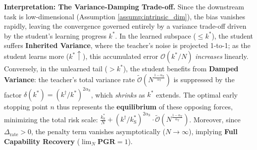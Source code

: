 \documentclass{article}
\theoremstyle{definition}
\theoremstyle{definition}
\theoremstyle{plain}
\theoremstyle{plain}
\theoremstyle{plain}
\theoremstyle{plain}
\theoremstyle{plain}
\newcommand{\te}{\mathrm{T}}
\newcommand{\st}{\mathrm{S}}
\newcommand{\opt}{\mathrm{opt}}
\begin{document}
\textbf{Interpretation: The Variance-Damping Trade-off.}
Since the downstream task is low-dimensional (Assumption \ref{assump:intrinsic_dim}), the bias vanishes rapidly, leaving the convergence governed entirely by a variance trade-off driven by the student's learning progress $k^*$.
In the learned subspace ($\le k^*$), the student suffers \textbf{Inherited Variance}, where the teacher's noise is projected 1-to-1; as the student learns more ($k^* \uparrow$), this accumulated error $\mathcal{O}(k^*/N)$ \textit{increases} linearly.
Conversely, in the unlearned tail ($> k^*$), the student benefits from \textbf{Damped Variance}: the teacher's total variance rate $\tilde{\mathcal{O}}(N^\frac{1-\alpha_\te}{\alpha_\te})$ is suppressed by the factor $\delta(k^*) = (k^\dagger/k^*)^{2\alpha_\st}$, which \textit{shrinks} as $k^*$ extends.
The optimal early stopping point $n$ thus represents the \textbf{equilibrium} of these opposing forces, minimizing the total risk scale: $\frac{k^*_\st}{N}+\left( {k^\dagger}/{k^*_\st}\right)^{2\alpha_\st} \cdot \tilde{\mathcal{O}}(N^\frac{1-\alpha_\te}{\alpha_\te})$.
Moreover, since $\Delta_{\mathrm{rate}} > 0$, the penalty term vanishes asymptotically ($N \to \infty$), implying \textbf{Full Capability Recovery} ($\lim_N \mathbf{PGR} = 1$). 


\end{document}

